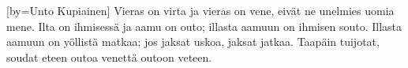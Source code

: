 

[by={Unto Kupiainen}]
  \beginverse
    Vieras on virta ja vieras on vene, 
    eivät ne unelmies uomia mene. 
    Ilta on ihmisessä ja aamu on outo; 
    illasta aamuun on ihmisen souto. 
    Illasta aamuun on yöllistä matkaa; 
    jos jaksat uskoa, jaksat jatkaa. 
    Taapäin tuijotat, soudat eteen 
    outoa venettä outoon veteen. 
  \endverse
\endsong
